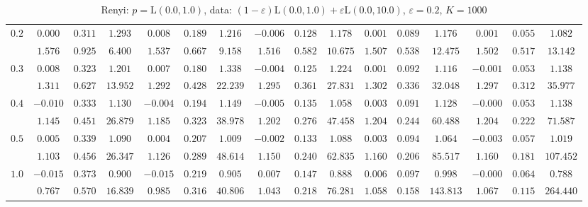 \begin{table}[ht]
\begin{center}
\begin{tabular}{|c|ccc|ccc|ccc|ccc|ccc|}
\hline 
$0.2$ & $ 0.000 $ & $ 0.311 $ & $ 1.293 $ & $ 0.008 $ & $ 0.189 $ & $ 1.216 $ & $ -0.006 $ & $ 0.128 $ & $ 1.178 $ & $ 0.001 $ & $ 0.089 $ & $ 1.176 $ & $ 0.001 $ & $ 0.055 $ & $ 1.082 $\\ 
 & $ 1.576 $ & $ 0.925 $ & $ 6.400 $ & $ 1.537 $ & $ 0.667 $ & $ 9.158 $ & $ 1.516 $ & $ 0.582 $ & $ 10.675 $ & $ 1.507 $ & $ 0.538 $ & $ 12.475 $ & $ 1.502 $ & $ 0.517 $ & $ 13.142 $\\ 
\hline 
$0.3$ & $ 0.008 $ & $ 0.323 $ & $ 1.201 $ & $ 0.007 $ & $ 0.180 $ & $ 1.338 $ & $ -0.004 $ & $ 0.125 $ & $ 1.224 $ & $ 0.001 $ & $ 0.092 $ & $ 1.116 $ & $ -0.001 $ & $ 0.053 $ & $ 1.138 $\\ 
 & $ 1.311 $ & $ 0.627 $ & $ 13.952 $ & $ 1.292 $ & $ 0.428 $ & $ 22.239 $ & $ 1.295 $ & $ 0.361 $ & $ 27.831 $ & $ 1.302 $ & $ 0.336 $ & $ 32.048 $ & $ 1.297 $ & $ 0.312 $ & $ 35.977 $\\ 
\hline 
$0.4$ & $ -0.010 $ & $ 0.333 $ & $ 1.130 $ & $ -0.004 $ & $ 0.194 $ & $ 1.149 $ & $ -0.005 $ & $ 0.135 $ & $ 1.058 $ & $ 0.003 $ & $ 0.091 $ & $ 1.128 $ & $ -0.000 $ & $ 0.053 $ & $ 1.138 $\\ 
 & $ 1.145 $ & $ 0.451 $ & $ 26.879 $ & $ 1.185 $ & $ 0.323 $ & $ 38.978 $ & $ 1.202 $ & $ 0.276 $ & $ 47.458 $ & $ 1.204 $ & $ 0.244 $ & $ 60.488 $ & $ 1.204 $ & $ 0.222 $ & $ 71.587 $\\ 
\hline 
$0.5$ & $ 0.005 $ & $ 0.339 $ & $ 1.090 $ & $ 0.004 $ & $ 0.207 $ & $ 1.009 $ & $ -0.002 $ & $ 0.133 $ & $ 1.088 $ & $ 0.003 $ & $ 0.094 $ & $ 1.064 $ & $ -0.003 $ & $ 0.057 $ & $ 1.019 $\\ 
 & $ 1.103 $ & $ 0.456 $ & $ 26.347 $ & $ 1.126 $ & $ 0.289 $ & $ 48.614 $ & $ 1.150 $ & $ 0.240 $ & $ 62.835 $ & $ 1.160 $ & $ 0.206 $ & $ 85.517 $ & $ 1.160 $ & $ 0.181 $ & $ 107.452 $\\ 
\hline 
$1.0$ & $ -0.015 $ & $ 0.373 $ & $ 0.900 $ & $ -0.015 $ & $ 0.219 $ & $ 0.905 $ & $ 0.007 $ & $ 0.147 $ & $ 0.888 $ & $ 0.006 $ & $ 0.097 $ & $ 0.998 $ & $ -0.000 $ & $ 0.064 $ & $ 0.788 $\\ 
 & $ 0.767 $ & $ 0.570 $ & $ 16.839 $ & $ 0.985 $ & $ 0.316 $ & $ 40.806 $ & $ 1.043 $ & $ 0.218 $ & $ 76.281 $ & $ 1.058 $ & $ 0.158 $ & $ 143.813 $ & $ 1.067 $ & $ 0.115 $ & $ 264.440 $\\ 
\hline 
\end{tabular}
\caption{Renyi: $p = \mathrm{L}(0.0,1.0)$, data: $(1-\varepsilon)\mathrm{L}(0.0,1.0) + \varepsilon \mathrm{L}(0.0,10.0)$, $\varepsilon =  0.2$, $K = 1000$} 
\end{center}
\end{table}

